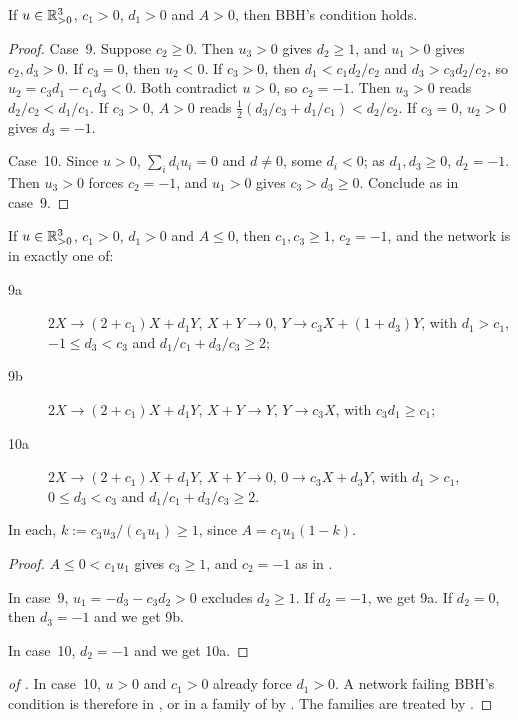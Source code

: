 \documentclass[11pt,a4paper]{report}
\begin{document}
\begin{lemma}\label{lem:hopf}
If \(u\in\mathbb{R}^3_{>0}\), \(c_1>0\), \(d_1>0\) and \(A>0\), then BBH's condition holds.
\end{lemma}

\begin{proof}
Case~9. Suppose \(c_2\ge0\). Then \(u_3>0\) gives \(d_2\ge1\), and \(u_1>0\) gives \(c_2,d_3>0\). If \(c_3=0\), then
\(u_2<0\). If \(c_3>0\), then \(d_1<c_1d_2/c_2\) and \(d_3>c_3d_2/c_2\), so \(u_2=c_3d_1-c_1d_3<0\). Both contradict
\(u>0\), so \(c_2=-1\). Then \(u_3>0\) reads \(d_2/c_2<d_1/c_1\). If \(c_3>0\), \(A>0\) reads
\(\tfrac12(d_3/c_3+d_1/c_1)<d_2/c_2\). If \(c_3=0\), \(u_2>0\) gives \(d_3=-1\).

Case~10. Since \(u>0\), \(\sum_id_iu_i=0\) and \(d\neq0\), some \(d_i<0\); as \(d_1,d_3\ge0\), \(d_2=-1\). Then \(u_3>0\) forces \(c_2=-1\), and \(u_1>0\) gives
\(c_3>d_3\ge0\). Conclude as in case~9.
\end{proof}

\begin{lemma}\label{lem:families}
If \(u\in\mathbb{R}^3_{>0}\), \(c_1>0\), \(d_1>0\) and \(A\le0\), then \(c_1,c_3\ge1\), \(c_2=-1\), and the network is in
exactly one of:
\begin{description}
\item[9a] \(2X\to(2+c_1)X+d_1Y\), \(X+Y\to0\), \(Y\to c_3X+(1+d_3)Y\), with \(d_1>c_1\), \(-1\le d_3<c_3\) and
  \(d_1/c_1+d_3/c_3\ge2\);
\item[9b] \(2X\to(2+c_1)X+d_1Y\), \(X+Y\to Y\), \(Y\to c_3X\), with \(c_3d_1\ge c_1\);
\item[10a] \(2X\to(2+c_1)X+d_1Y\), \(X+Y\to0\), \(0\to c_3X+d_3Y\), with \(d_1>c_1\), \(0\le d_3<c_3\) and
  \(d_1/c_1+d_3/c_3\ge2\).
\end{description}
In each, \(k:=c_3u_3/(c_1u_1)\ge1\), since \(A=c_1u_1(1-k)\).
\end{lemma}

\begin{proof}
\(A\le0<c_1u_1\) gives \(c_3\ge1\), and \(c_2=-1\) as in .

In case~9, \(u_1=-d_3-c_3d_2>0\) excludes \(d_2\ge1\). If \(d_2=-1\), we get 9a. If \(d_2=0\), then \(d_3=-1\) and
we get 9b.

In case~10, \(d_2=-1\) and we get 10a.
\end{proof}

\begin{proof}[of ]
In case~10, \(u>0\) and \(c_1>0\) already force \(d_1>0\). A network failing BBH's condition is therefore in
, or in a family of  by . The families are treated by
.
\end{proof}
\end{document}
